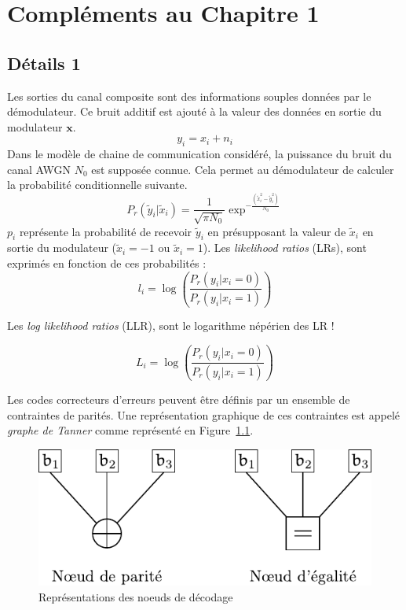 
\appendix

\chapter{Compléments au Chapitre 1}
\section{Détails 1}\label{append:decoding_nodes}

Les sorties du canal composite sont des informations souples données par le démodulateur.
Ce bruit additif est ajouté à la valeur des données en sortie du modulateur $\mathbold{x}$.
\begin{equation}
y_i = x_i + n_i
\end{equation}
Dans le modèle de chaine de communication considéré, la puissance du bruit du canal AWGN $N_0$ est supposée connue.
Cela permet au démodulateur de calculer la probabilité conditionnelle suivante.
\begin{equation}
	P_r( \tilde{y}_i|\tilde{x}_i) = \dfrac{1}{\sqrt{\pi N_0}}\exp^{-\tfrac{(\tilde{x}_i^2-\tilde{y}_i^2)}{N_0}}
\end{equation}
$p_i$ représente la probabilité de recevoir $\tilde{y}_i$ en présupposant la valeur de $\tilde{x}_i$ en sortie du modulateur ($\tilde{x}_i=-1$ ou $\tilde{x}_i=1$). Les \textit{likelihood ratios} (LRs), sont exprimés en fonction de ces probabilités :
\begin{equation}
	l_i = \log\left(\dfrac{P_r(y_i | x_i = 0)}{P_r(y_i | x_i = 1)}\right)
\end{equation}
\label{eq:lr}

Les \textit{log likelihood ratios} (LLR), sont le logarithme népérien des LR ! 

\begin{equation}
  L_i = \log\left(\dfrac{P_r(y_i | x_i = 0)}{P_r(y_i | x_i = 1)}\right)
\end{equation}
\label{eq:llr}


Les codes correcteurs d'erreurs peuvent être définis par un ensemble de contraintes de parités. Une représentation graphique de ces contraintes est appelé \textit{graphe de Tanner} comme représenté en Figure~\ref{fig:noeuds}.

\begin{figure}[t]
\centering
\includegraphics{tail/appendix_1_fig/noeuds}
\caption{Représentations des noeuds de décodage}
\label{fig:noeuds}
\end{figure}

